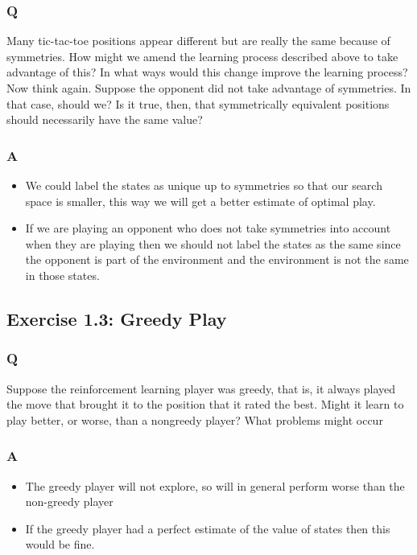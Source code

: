 \documentclass[a4paper, oneside, 11pt]{article}
\begin{document}
\subsubsection{Q}
Many tic-tac-toe positions appear different but are really the same because of symmetries. How might we amend the learning process described above to take advantage of this? In what ways would this change improve the learning process? Now think again. Suppose the opponent did not take advantage of symmetries. In that case, should we? Is it true, then, that symmetrically equivalent positions should necessarily have the same value?

\subsubsection{A}
\begin{itemize}
    \item We could label the states as unique up to symmetries so that our search space is smaller, this way we will get a better estimate of optimal play.
    \item If we are playing an opponent who does not take symmetries into account when they are playing then we should not label the states as the same since the opponent is part of the environment and the environment is not the same in those states.
\end{itemize}

\subsection{Exercise 1.3: Greedy Play}
\subsubsection{Q}
Suppose the reinforcement learning player was greedy, that is, it always played the move that brought it to the position that it rated the best. Might it learn to play better, or worse, than a nongreedy player? What problems might occur

\subsubsection{A}
\begin{itemize}
    \item The greedy player will not explore, so will in general perform worse than the non-greedy player
    \item If the greedy player had a perfect estimate of the value of states then this would be fine.
\end{itemize}
\end{document}
